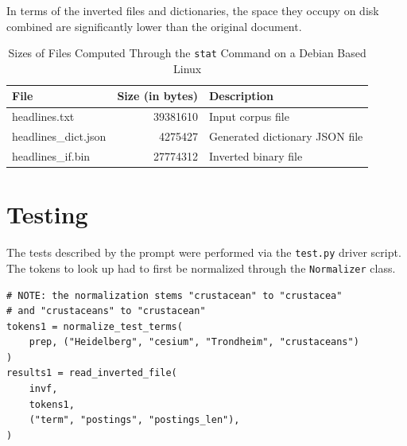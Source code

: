 \documentclass[11pt]{article}
\begin{document}
In terms of the inverted files and dictionaries, the space they occupy on disk combined are significantly lower than the original document.

\begin{table}[h]
    \begin{center}
        
        \begin{tabular}{| l | r | l |}
        \hline
        \textbf{File} & \textbf{Size (in bytes)} & \textbf{Description} \\
        \hline
        headlines.txt & 39381610 & Input corpus file \\
        headlines\_dict.json & 4275427 & Generated dictionary JSON file \\
        headlines\_if.bin & 27774312 & Inverted binary file \\
        \hline
        \end{tabular}

    \end{center}
    \caption{Sizes of Files Computed Through the \texttt{stat} Command on a Debian Based Linux}

\end{table}

\section{Testing}
The tests described by the prompt were performed via the \texttt{test.py} driver script. The tokens to look up had to first be normalized through the \texttt{Normalizer} class.

\begin{lstlisting}[style=mypython,
    caption=Test 1: Document frequency and postings list for the terms: "Heidelberg"\, "cesium"\, "Trondheim"\, "crustacean"]
# NOTE: the normalization stems "crustacean" to "crustacea"
# and "crustaceans" to "crustacean"
tokens1 = normalize_test_terms(
    prep, ("Heidelberg", "cesium", "Trondheim", "crustaceans")
)
results1 = read_inverted_file(
    invf,
    tokens1,
    ("term", "postings", "postings_len"),
)
\end{lstlisting}
\end{document}
